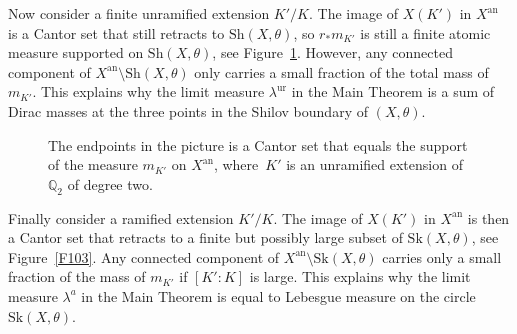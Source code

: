 \documentclass[JEP,XML,SOM,Unicode,NoFloatCountersInSection]{cedram}
\theoremstyle{definition}
\numberwithin{equation}{subsection}
\newcommand{\Q}{\ensuremath{\mathbb{Q}}}
\newcommand{\an}{\mathrm{an}}
\newcommand{\Sh}{\mathrm{Sh}}
\newcommand{\Sk}{\mathrm{Sk}}
\newcommand{\ur}{\mathrm{ur}}
\let\form\theta
\let\Leb\lambda
\begin{document}
Now consider a finite unramified extension $K'/K$. The image of $X(K')$ in $X^{\an}$ is a Cantor set that still retracts to $\Sh(X,\form)$, so $r_*m_{K'}$ is still a finite atomic measure supported on $\Sh(X,\form)$, see Figure~\ref{F102}.
However, any connected component of $X^{\an}\setminus\Sh(X,\form)$ only carries a small fraction of the total mass of $m_{K'}$.
This explains why the limit measure $\Leb^{\ur}$ in the Main Theorem is a sum of Dirac masses at the three points in the Shilov boundary of $(X,\form)$.
\begin{figure}[ht]
\centering
{}
\caption{\smaller The endpoints in the picture is a Cantor set that equals the support of the measure $m_{K'}$ on $X^{\an}$, where~$K'$ is an unramified extension of $\Q_2$ of degree two.}\label{F102}
\end{figure}

Finally consider a ramified extension $K'/K$.
The image of $X(K')$ in $X^{\an}$ is then a Cantor set that retracts to a finite but possibly large subset of $\Sk(X,\form)$, see Figure~\ref{F103}. Any connected component of $X^{\an}\setminus\Sk(X,\form)$ carries only a small fraction of the mass of $m_{K'}$ if $[K':K]$ is large.
This explains why the limit measure $\Leb^a$ in the Main Theorem is equal to Lebesgue measure on the circle $\Sk(X,\form)$.
\end{document}
